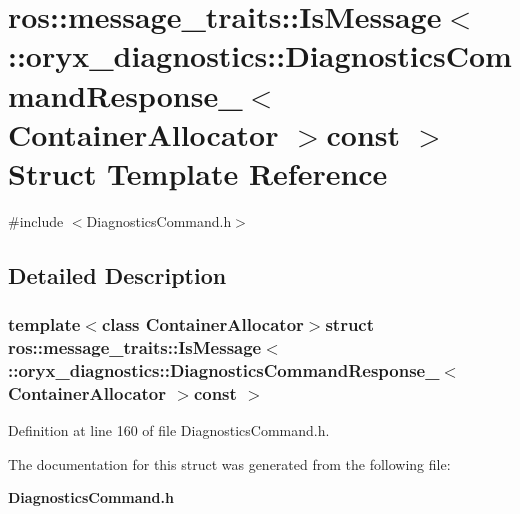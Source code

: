 \section{ros\-:\-:message\-\_\-traits\-:\-:\-Is\-Message$<$ \-:\-:oryx\-\_\-diagnostics\-:\-:\-Diagnostics\-Command\-Response\-\_\-$<$ \-Container\-Allocator $>$const $>$ \-Struct \-Template \-Reference}
\label{structros_1_1message__traits_1_1IsMessage_3_01_1_1oryx__diagnostics_1_1DiagnosticsCommandRespons04908d0832cc5495f439e2abeae5683a}


{\ttfamily \#include $<$\-Diagnostics\-Command.\-h$>$}



\subsection{\-Detailed \-Description}
\subsubsection*{template$<$class Container\-Allocator$>$struct ros\-::message\-\_\-traits\-::\-Is\-Message$<$ \-::oryx\-\_\-diagnostics\-::\-Diagnostics\-Command\-Response\-\_\-$<$ Container\-Allocator $>$const  $>$}



\-Definition at line 160 of file \-Diagnostics\-Command.\-h.



\-The documentation for this struct was generated from the following file\-:\begin{DoxyCompactItemize}
\item 
{\bf \-Diagnostics\-Command.\-h}\end{DoxyCompactItemize}
